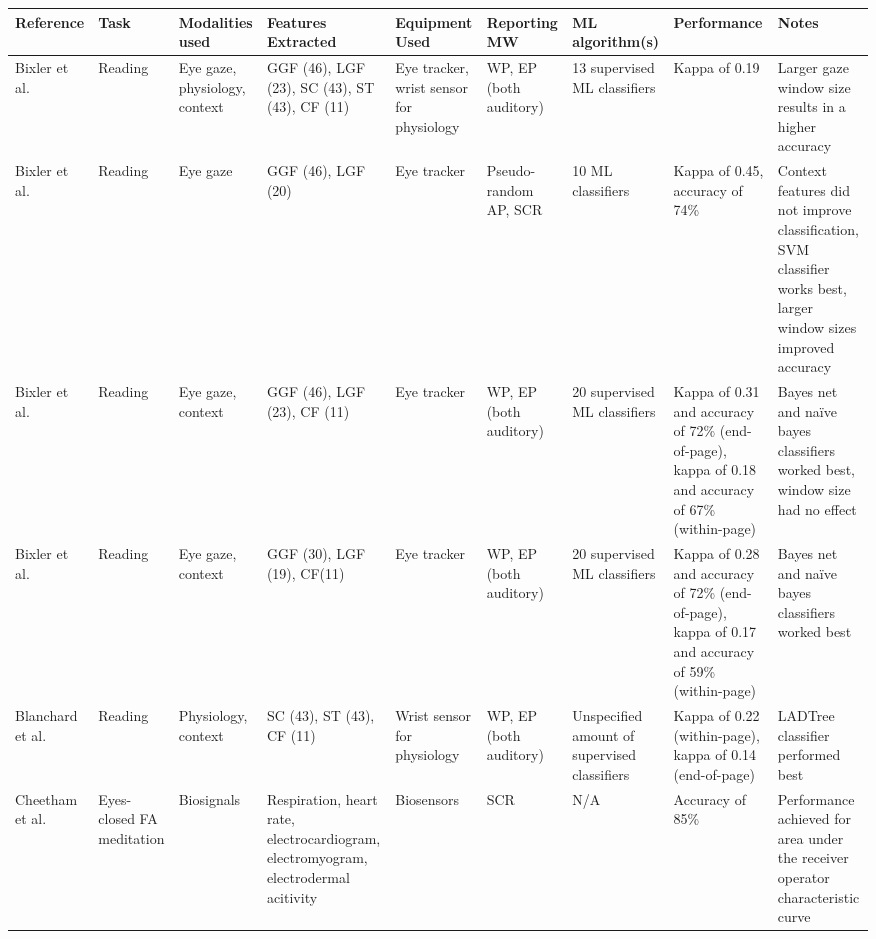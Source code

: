 \begin{xtabular}{p{25mm}p{30mm}p{30mm}p{22mm}p{38mm}p{22mm}p{33mm}p{22mm}p{35mm}}
  \toprule
        Reference & Task & Modalities used & Features Extracted \footnotemark[1] & Equipment Used & Reporting MW \footnotemark[2] & ML algorithm(s) & Performance & Notes\\
  \midrule
Bixler et al. \cite{Bixler2015AutomaticPhysiology} & Reading & Eye gaze, physiology, context & GGF (46), LGF (23), SC (43), ST (43), CF (11)  & Eye tracker, wrist sensor for physiology & WP, EP (both auditory) & 13 supervised ML classifiers & Kappa of 0.19 & Larger gaze window size results in a higher accuracy \\
\midrule
Bixler et al. \cite{Bixler2015AutomaticAwareness} & Reading & Eye gaze & GGF (46), LGF (20) & Eye tracker & Pseudo-random AP, SCR & 10 ML classifiers & Kappa of 0.45, accuracy of 74\% & Context features did not improve classification, SVM classifier works best, larger window sizes improved accuracy\\
\midrule
Bixler et al. \cite{Bixler2016AutomaticReadingd} & Reading & Eye gaze, context & GGF (46), LGF (23), CF (11) & Eye tracker & WP, EP (both auditory) & 20 supervised ML classifiers & Kappa of 0.31 and accuracy of 72\% (end-of-page), kappa of 0.18 and accuracy of 67\% (within-page) & Bayes net and naïve bayes classifiers worked best, window size had no effect \\
\midrule
Bixler et al. \cite{Bixler2014TowardWanderingd} & Reading & Eye gaze, context & GGF (30), LGF (19), CF(11) & Eye tracker & WP, EP (both auditory) & 20 supervised ML classifiers & Kappa of 0.28 and accuracy of 72\% (end-of-page), kappa of 0.17 and accuracy of 59\% (within-page) & Bayes net and naïve bayes classifiers worked best \\
\midrule
Blanchard et al. \cite{Blanchard2014AutomatedLearning} & Reading & Physiology, context & SC (43), ST (43), CF (11) & Wrist sensor for physiology & WP, EP (both auditory) & Unspecified amount of supervised classifiers & Kappa of 0.22 (within-page), kappa of 0.14 (end-of-page) & LADTree classifier performed best \\
\midrule
Cheetham et al. \cite{Cheetham2016AutomatedApplication} & Eyes-closed FA meditation & Biosignals & Respiration, heart rate, electrocardiogram, electromyogram, electrodermal acitivity & Biosensors & SCR & N/A & Accuracy of 85\% & Performance achieved for area under the receiver operator characteristic curve\\
\midrule

\end{xtabular}
